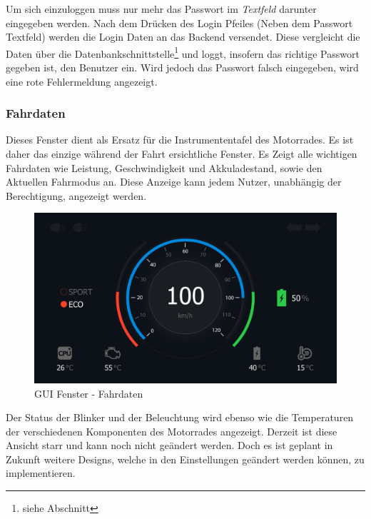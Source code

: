  Um sich einzuloggen muss nur mehr das Passwort im \textit{Textfeld} darunter eingegeben werden. Nach dem Drücken des Login Pfeiles (Neben dem Passwort Textfeld) werden die Login Daten an das Backend versendet. Diese vergleicht die Daten über die Datenbankschnittstelle\footnote{siehe Abschnitt} und loggt, insofern das richtige Passwort gegeben ist, den Benutzer ein. Wird jedoch das Passwort falsch eingegeben, wird eine rote Fehlermeldung angezeigt.\\
 
\subsubsection{Fahrdaten}		

Dieses Fenster dient als Ersatz für die Instrumententafel des Motorrades. Es ist daher das einzige während der Fahrt ersichtliche Fenster. Es Zeigt alle wichtigen Fahrdaten wie Leistung, Geschwindigkeit und Akkuladestand, sowie den Aktuellen Fahrmodus an. Diese Anzeige kann jedem Nutzer, unabhängig der Berechtigung, angezeigt werden.

\begin{figure}[H]
	\begin{center}
		\includegraphics[scale=0.25]{figures/hcis/window_dashboard.png}
			\caption{GUI Fenster - Fahrdaten}
			\label{fig:pageDash}
	\end{center}
\end{figure}

Der Status der Blinker und der Beleuchtung wird ebenso wie die Temperaturen der verschiedenen Komponenten des Motorrades angezeigt. Derzeit ist diese Ansicht starr und kann noch nicht geändert werden. Doch es ist geplant in Zukunft weitere Designs, welche in den Einstellungen geändert werden können, zu implementieren.

